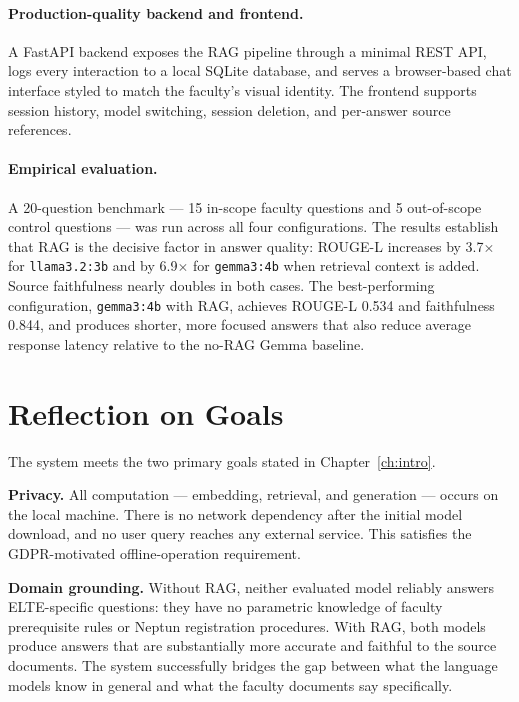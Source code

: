 \paragraph{Production-quality backend and frontend.}
A FastAPI backend exposes the RAG pipeline through a minimal REST API, logs every interaction to a local SQLite database, and serves a browser-based chat interface styled to match the faculty's visual identity. The frontend supports session history, model switching, session deletion, and per-answer source references.

\paragraph{Empirical evaluation.}
A 20-question benchmark — 15 in-scope faculty questions and 5 out-of-scope control questions — was run across all four configurations. The results establish that RAG is the decisive factor in answer quality: ROUGE-L increases by 3.7$\times$ for \texttt{llama3.2:3b} and by 6.9$\times$ for \texttt{gemma3:4b} when retrieval context is added. Source faithfulness nearly doubles in both cases. The best-performing configuration, \texttt{gemma3:4b} with RAG, achieves ROUGE-L 0.534 and faithfulness 0.844, and produces shorter, more focused answers that also reduce average response latency relative to the no-RAG Gemma baseline.

\section{Reflection on Goals}
\label{sec:sum-reflection}

The system meets the two primary goals stated in Chapter~\ref{ch:intro}.

\textbf{Privacy.} All computation — embedding, retrieval, and generation — occurs on the local machine. There is no network dependency after the initial model download, and no user query reaches any external service. This satisfies the GDPR-motivated offline-operation requirement.

\textbf{Domain grounding.} Without RAG, neither evaluated model reliably answers ELTE-specific questions: they have no parametric knowledge of faculty prerequisite rules or Neptun registration procedures. With RAG, both models produce answers that are substantially more accurate and faithful to the source documents. The system successfully bridges the gap between what the language models know in general and what the faculty documents say specifically.

